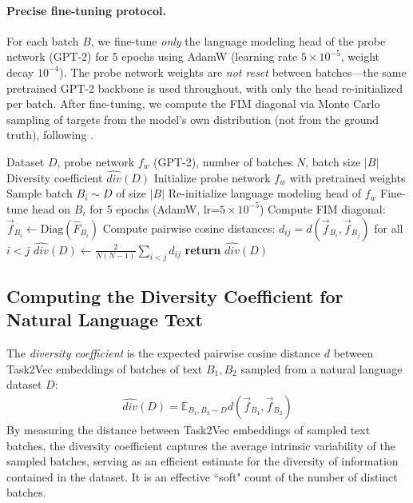 \paragraph{Precise fine-tuning protocol.}
For each batch $B$, we fine-tune \textit{only} the language modeling head of the probe network (GPT-2) for 5 epochs using AdamW (learning rate $5 \times 10^{-5}$, weight decay $10^{-4}$).
The probe network weights are \textit{not reset} between batches---the same pretrained GPT-2 backbone is used throughout, with only the head re-initialized per batch.
After fine-tuning, we compute the FIM diagonal via Monte Carlo sampling of targets from the model's own distribution (not from the ground truth), following \citet{task2vec}.

\begin{algorithm}[h]
\caption{Computing the Diversity Coefficient}\label{alg:div_coeff}
\begin{algorithmic}[1]
\REQUIRE Dataset $D$, probe network $f_w$ (GPT-2), number of batches $N$, batch size $|B|$
\ENSURE Diversity coefficient $\hat{div}(D)$
\STATE Initialize probe network $f_w$ with pretrained weights
\STATE Sample batch $B_i \sim D$ of size $|B|$
\STATE Re-initialize language modeling head of $f_w$
\STATE Fine-tune head on $B_i$ for 5 epochs (AdamW, lr=$5 \times 10^{-5}$)
\STATE Compute FIM diagonal: $\vec{f}_{B_i} \leftarrow \text{Diag}(\hat{F}_{B_i})$
\ENDFOR
\STATE Compute pairwise cosine distances: $d_{ij} = d(\vec{f}_{B_i}, \vec{f}_{B_j})$ for all $i < j$
\STATE $\hat{div}(D) \leftarrow \frac{2}{N(N-1)} \sum_{i<j} d_{ij}$
\STATE \textbf{return} $\hat{div}(D)$
\end{algorithmic}
\end{algorithm}

\subsection{Computing the Diversity Coefficient for Natural Language Text}
\label{body:div_coeff_natural_lang}
The \textit{diversity coefficient} is the expected pairwise cosine distance $d$ between Task2Vec embeddings of batches of text $B_1, B_2$ sampled from a natural language dataset $D$:
\begin{equation*}
\begin{aligned}
    \hat{div}(D) =
    \mathbb{E}_{B_1, B_2 \sim D} 
     d( \vec{f}_{B_1}, \vec{f}_{B_2} )
\end{aligned}
\end{equation*}
By measuring the distance between Task2Vec embeddings of sampled text batches, the diversity coefficient captures the average intrinsic variability of the sampled batches, serving as an efficient estimate for the diversity of information contained in the dataset. 
It is an effective ``soft" count of the number of distinct batches. 

